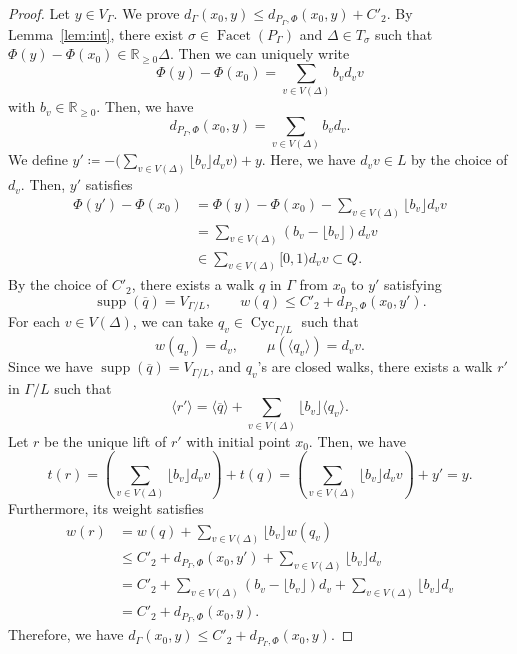 \documentclass[ALCO,published]{cedram}
\theoremstyle{remark}
\begin{document}
\begin{proof}
Let $y \in V_{\Gamma}$. 
We prove $d_{\Gamma}(x_0, y) \le d_{P_{\Gamma}, \Phi} (x_0, y) + C' _2$. 
By Lemma~\ref{lem:int}, there exist $\sigma \in \operatorname{Facet}(P_{\Gamma})$ and $\Delta \in T_{\sigma}$
such that $\Phi(y) - \Phi(x_0) \in \mathbb{R}_{\ge 0} \Delta$. 
Then we can uniquely write 
\[
\Phi(y) - \Phi(x_0)  = \sum _{v \in V(\Delta)} b_v d_v v
\]
with $b_v \in \mathbb{R}_{\ge 0}$. 
Then, we have 
\[
d_{P_{\Gamma}, \Phi} (x_0, y) = \sum _{v \in V(\Delta)} b_v d_v. 
\]
We define $y' \coloneqq  - \bigl( \sum _{v \in V(\Delta)} \lfloor b_v \rfloor d_v v \bigr) + y$. 
Here, we have $d_v v \in L$ by the choice of $d_v$. 
Then, $y'$ satisfies
\begin{align*}
\Phi(y') - \Phi(x_0)
&= \Phi(y) - \Phi(x_0) - \sum _{v \in V(\Delta)} \lfloor b_v \rfloor d_v v \\
&= \sum _{v \in V(\Delta)} (b_v - \lfloor b_v \rfloor) d_v v \\
& \in \sum_{v \in V(\Delta)} [0,1) d_v v
\subset Q. 
\end{align*}
By the choice of $C' _2$, 
there exists a walk $q$ in $\Gamma$ from $x_0$ to $y'$ satisfying 
\[
\operatorname{supp}(\overline{q}) = V_{\Gamma /L}, \qquad 
w(q) \le C' _2 + d_{P_{\Gamma}, \Phi} (x_0, y'). 
\]
For each $v \in V(\Delta)$, we can take $q_v \in \operatorname{Cyc}_{\Gamma /L}$ such that 
\[
w(q_v) = d_v, \qquad 
\mu(\langle q_v \rangle) = d_v v. 
\]
Since we have $\operatorname{supp}(\overline{q}) = V_{\Gamma /L}$, and $q_v$'s are closed walks, 
there exists a walk $r'$ in $\Gamma /L$ such that 
\[
\langle r' \rangle = \langle \overline{q} \rangle + \sum _{v \in V(\Delta)} \lfloor b_v \rfloor \langle q_v \rangle. 
\]
Let $r$ be the unique lift of $r'$ with initial point $x_0$. 
Then, we have
\[
t(r) 
= \left( \sum _{v \in V(\Delta)} \lfloor b_v \rfloor d_v v \right)+ t(q) 
= \left( \sum _{v \in V(\Delta)} \lfloor b_v \rfloor d_v v \right)+ y' 
= y. 
\]
Furthermore, its weight satisfies
\begin{align*}
w(r) 
&= w(q) + \sum _{v \in V(\Delta)} \lfloor b_v \rfloor w(q_v) \\
&\le C' _2 + d_{P_{\Gamma}, \Phi}(x_0,y') + \sum _{v \in V(\Delta)} \lfloor b_v \rfloor d_v \\
&= C' _2 + \sum _{v \in V(\Delta)} (b_v - \lfloor b_v \rfloor) d_v 
    + \sum _{v \in V(\Delta)} \lfloor b_v \rfloor d_v \\
&= C' _2 + d_{P_{\Gamma}, \Phi} (x_0,y).
\end{align*}
Therefore, we have $d_{\Gamma}(x_0, y) \le C' _2 + d_{P_{\Gamma}, \Phi} (x_0, y)$. 
\end{proof}
\end{document}
